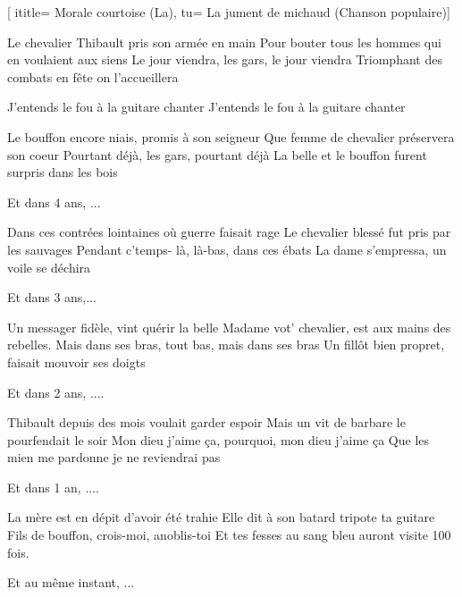 [
ititle= {Morale courtoise (La)},
tu= {La jument de michaud (Chanson populaire)}]


\beginverse
Le chevalier Thibault pris son armée en main
Pour bouter tous les hommes qui en voulaient aux siens
Le jour viendra, les gars, le jour viendra
Triomphant des combats en fête on l'accueillera
\endverse

\beginchorus
{} {J'entends le fou à la guitare chanter}
 {J'entends le fou à la guitare chanter}
\endchorus

\beginverse
Le bouffon encore niais, promis à son seigneur
Que femme de chevalier préservera son coeur
Pourtant déjà, les gars, pourtant déjà
La belle et le bouffon furent surpris dans les bois
\endverse

\beginchorus
Et dans 4 ans, ...
\endchorus

\beginverse
Dans ces contrées lointaines où guerre faisait rage
Le chevalier blessé fut pris par les sauvages
Pendant c'temps- là, là-bas, dans ces ébats
La dame s'empressa, un voile se déchira
\endverse

\beginchorus
Et dans 3 ans,...
\endchorus

\beginverse
Un messager fidèle, vint quérir la belle
Madame vot' chevalier, est aux mains des rebelles.
Mais dans ses bras, tout bas, mais dans ses bras
Un fillôt bien propret, faisait mouvoir ses doigts
\endverse

\beginchorus
Et dans 2 ans, ....
\endchorus

\beginverse
Thibault depuis des mois voulait garder espoir
Mais un vit de barbare le pourfendait le soir
Mon dieu j'aime ça, pourquoi, mon dieu j'aime ça
Que les mien me pardonne je ne reviendrai pas
\endverse

\beginchorus
Et dans 1 an, ....
\endchorus

\beginverse
La mère est en dépit d'avoir été trahie
Elle dit à son batard tripote ta guitare
Fils de bouffon, crois-moi, anoblis-toi
Et tes fesses au sang bleu auront visite 100 fois. 
\endverse

\beginchorus
Et au même instant, ...
\endchorus

\endsong
